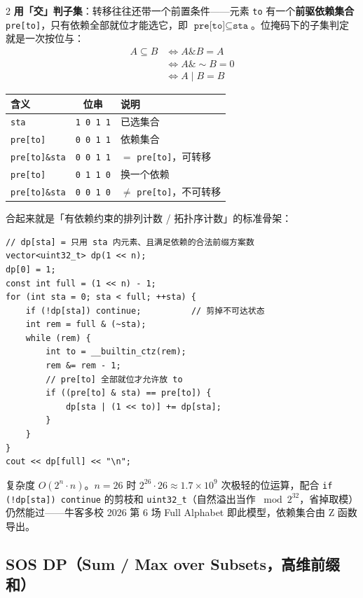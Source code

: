 \begin{multicols*}{2}
		\textbf{用「交」判子集}：转移往往还带一个前置条件——元素 \texttt{to} 有一个\textbf{前驱依赖集合} \texttt{pre[to]}，只有依赖全部就位才能选它，即 $\texttt{pre[to]} \subseteq \texttt{sta}$。位掩码下的子集判定就是一次按位与：
		\begin{align*}
			A \subseteq B &\iff A \mathbin{\&} B = A \\
			              &\iff A \mathbin{\&} \sim\! B = 0 \\
			              &\iff A \mathbin{|} B = B
		\end{align*}

		\begin{center}
			\begin{tabular}{l|c|l}
				\hline
				含义 & 位串 & 说明 \\
				\hline
				\texttt{sta}          & \texttt{1 0 1 1} & 已选集合 \\
				\texttt{pre[to]}      & \texttt{0 0 1 1} & 依赖集合 \\
				\texttt{pre[to]\&sta} & \texttt{0 0 1 1} & $=$ \texttt{pre[to]}，可转移 \\
				\hline
				\texttt{pre[to]}      & \texttt{0 1 1 0} & 换一个依赖 \\
				\texttt{pre[to]\&sta} & \texttt{0 0 1 0} & $\neq$ \texttt{pre[to]}，不可转移 \\
				\hline
			\end{tabular}
		\end{center}

		合起来就是「有依赖约束的排列计数 / 拓扑序计数」的标准骨架：

		\begin{verbatim}
// dp[sta] = 只用 sta 内元素、且满足依赖的合法前缀方案数
vector<uint32_t> dp(1 << n);
dp[0] = 1;
const int full = (1 << n) - 1;
for (int sta = 0; sta < full; ++sta) {
	if (!dp[sta]) continue;          // 剪掉不可达状态
	int rem = full & (~sta);
	while (rem) {
		int to = __builtin_ctz(rem);
		rem &= rem - 1;
		// pre[to] 全部就位才允许放 to
		if ((pre[to] & sta) == pre[to]) {
			dp[sta | (1 << to)] += dp[sta];
		}
	}
}
cout << dp[full] << "\n";
		\end{verbatim}

		复杂度 $O(2^n \cdot n)$。$n = 26$ 时 $2^{26} \cdot 26 \approx 1.7 \times 10^9$ 次极轻的位运算，配合 \texttt{if (!dp[sta]) continue} 的剪枝和 \texttt{uint32\_t}（自然溢出当作 $\bmod 2^{32}$，省掉取模）仍然能过——牛客多校 2026 第 6 场 Full Alphabet 即此模型，依赖集合由 Z 函数导出。

		\subsection{SOS DP（Sum / Max over Subsets，高维前缀和）}


\end{multicols*}
